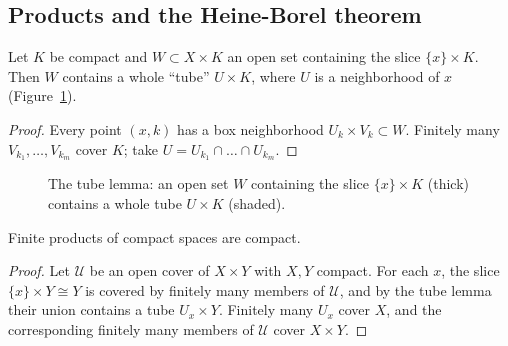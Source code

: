 \subsection{Products and the Heine-Borel theorem}

\begin{lem}\label{lem tube}
    Let $K$ be compact and $W\subset X\times K$ an open set containing the slice $\{x\}\times K$. Then $W$ contains a whole ``tube'' $U\times K$, where $U$ is a neighborhood of $x$ (Figure~\ref{fig tube lemma}).
\end{lem}
\begin{proof}
    Every point $(x,k)$ has a box neighborhood $U_k\times V_k\subset W$. Finitely many $V_{k_1},\ldots,V_{k_m}$ cover $K$; take $U=U_{k_1}\cap\ldots\cap U_{k_m}$.
\end{proof}

\begin{figure}[tp]
    \centering
    \caption{The tube lemma: an open set $W$ containing the slice $\{x\}\times K$ (thick) contains a whole tube $U\times K$ (shaded).}
    \label{fig tube lemma}
\end{figure}

\begin{prop}\label{prop product compact}
    Finite products of compact spaces are compact.
\end{prop}
\begin{proof}
    Let $\mathscr{U}$ be an open cover of $X\times Y$ with $X,Y$ compact. For each $x$, the slice $\{x\}\times Y\cong Y$ is covered by finitely many members of $\mathscr{U}$, and by the tube lemma their union contains a tube $U_x\times Y$. Finitely many $U_x$ cover $X$, and the corresponding finitely many members of $\mathscr{U}$ cover $X\times Y$.
\end{proof}

